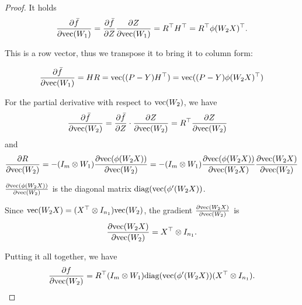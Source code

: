 \documentclass[a4paper,11pt]{article}
\newcommand{\1}{\mathbbm{1}}
\theoremstyle{plain}
\begin{document}
\begin{proof}
It holds
\begin{equation*}
    \frac{\partial \bar f}{\partial \textnormal{vec}(W_1)} = \frac{\partial \bar f}{\partial Z} \frac{\partial Z}{\partial \textnormal{vec}(W_1)} = R^\top H^\top = R^\top \phi(W_2 X)^\top .
\end{equation*}

This is a row vector, thus we transpose it to bring it to column form:

\begin{equation*}
    \frac{\partial \bar f}{\partial \textnormal{vec}(W_1)} = H R = \textnormal{vec}((P-Y) H^\top) = \textnormal{vec}((P-Y) \phi(W_2 X)^\top)
\end{equation*}

For the partial derivative with respect to $\textnormal{vec}(W_2)$, we have
\begin{align*}
   &\frac{\partial \bar f}{\partial \textnormal{vec}(W_2)} = \frac{\partial \bar f}{\partial Z} \cdot \frac{\partial Z}{\partial \textnormal{vec}(W_2) } = R^\top \frac{\partial Z}{\partial \textnormal{vec}(W_2) }
\end{align*}
and
\begin{align*}
    \frac{\partial R}{\partial \textnormal{vec}(W_2)} = -(I_m \otimes W_1) \frac{\partial \textnormal{vec}(\phi(W_2 X))}{\partial \textnormal{vec}(W_2)} = -(I_m \otimes W_1) \frac{\partial \textnormal{vec}(\phi(W_2 X))}{\partial \textnormal{vec}(W_2 X)} \frac{\partial \textnormal{vec}(W_2 X)}{\partial \textnormal{vec}(W_2)}
\end{align*}

$\frac{\partial \textnormal{vec}(\phi(W_2 X))}{\partial \textnormal{vec}(W_2)}$ is the diagonal matrix $\textnormal{diag}(\textnormal{vec}(\phi'(W_2 X))$.

Since $\textnormal{vec}(W_2 X) = (X^\top \otimes I_{n_1}) \textnormal{vec}(W_2)$, the gradient $\frac{\partial \textnormal{vec}(W_2 X)}{\partial \textnormal{vec}(W_2)}$ is 
\begin{equation*}
    \frac{\partial \textnormal{vec}(W_2 X)}{\partial \textnormal{vec}(W_2)} = X^\top \otimes I_{n_1}.
\end{equation*}

Putting it all together, we have
\begin{equation*}
   \frac{\partial f}{\partial \textnormal{vec}(W_2)} = R^\top (I_m \otimes W_1) \textnormal{diag}(\textnormal{vec}(\phi'(W_2 X)) (X^\top \otimes I_{n_1}).
\end{equation*}


\end{proof}
\end{document}
